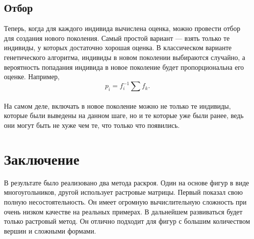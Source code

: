 \documentclass[14pt]{extarticle}
\begin{document}
	\subsection{Отбор}
	Теперь, когда для каждого индивида вычислена оценка, можно провести отбор для создания нового поколения. Самый простой вариант --- взять только те индивиды, у которых достаточно хорошая оценка. В классическом варианте генетического алгоритма, индивиды в новом поколении выбираются случайно, а вероятность попадания индивида в новое поколение будет пропорциональна его оценке. Например,
	\begin{equation}
		p_i = f_i^{-1}\sum f_k.
	\end{equation}
	\paragraph{}
	На самом деле, включать в новое поколение можно не только те индивиды, которые были выведены на данном шаге, но и те которые уже были ранее, ведь они могут быть не хуже чем те, что только что появились.
	\newpage
	\section{Заключение}
	В результате было реализовано два метода раскроя. Один на основе фигур в виде многоугольников, другой использует растровые матрицы. Первый показал свою полную несостоятельность. Он имеет огромную вычислительную сложность при очень низком качестве на реальных примерах. В дальнейшем развиваться будет только растровый метод. Он отлично подходит для фигур с большим количеством вершин и сложными формами.
\end{document}
